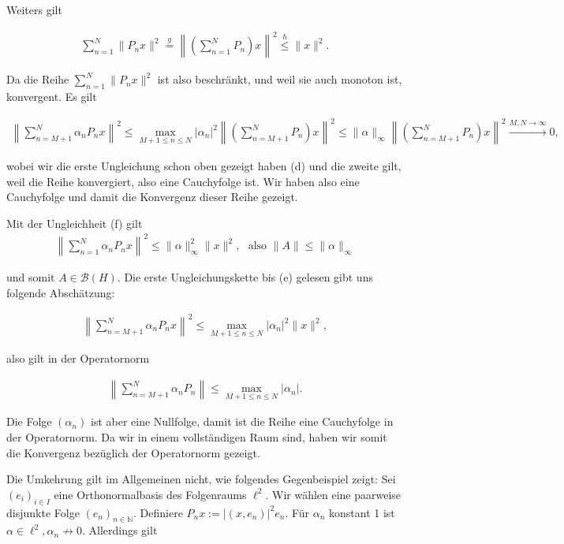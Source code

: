 \begin{solution}
  Weiters gilt

  \begin{align}
      \sum_{n = 1}^N \| P_n x \|^2 \stackrel{g}{=}
       \left\| \left(\sum_{n = 1}^N P_n\right) x \right\|^2 \stackrel{h}{\leq} \|x\|^2.
  \end{align}

  Da die Reihe $\sum_{n = 1}^N \| P_n x \|^2$ ist also beschränkt, und weil sie auch monoton ist, konvergent. Es gilt

  \begin{align}
  \left\| \sum_{n = M+1}^N \alpha_n P_n x \right\|^2 \leq \max_{M+1 \leq n \leq N} |\alpha_n|^2 \left\| \left(\sum_{n = M+1}^N P_n\right) x \right\|^2
  \leq \|\alpha\|_{\infty} \left\| \left(\sum_{n = M+1}^N P_n\right) x \right\|^2 \stackrel{M, N \rightarrow \infty}{\longrightarrow} 0,
  \end{align}

  wobei wir die erste Ungleichung schon oben gezeigt haben (d) und die zweite gilt, weil die Reihe konvergiert, also eine Cauchyfolge ist. Wir haben also eine Cauchyfolge und damit die Konvergenz dieser Reihe gezeigt.

  Mit der Ungleichheit (f) gilt
  \begin{align}
      \left\| \sum_{n = 1}^N \alpha_n P_n x \right\|^2 \leq \| \alpha \|_{\infty}^2 \| x \|^2, \text{~~also~} \|A\| \leq \|\alpha\|_{\infty}
  \end{align}

  und somit $A \in \mathcal{B}(H).$ Die erste Ungleichungskette bis (e) gelesen gibt uns folgende Abschätzung:

  \begin{align}
  \left\| \sum_{n = M+1}^N \alpha_n P_n x \right\|^2 \leq \max_{M+1 \leq n \leq N} |\alpha_n|^2 \|x\|^2,
  \end{align}

  also gilt in der Operatornorm

  \begin{align}
  \left\| \sum_{n = M+1}^N \alpha_n P_n \right\| \leq \max_{M+1 \leq n \leq N} |\alpha_n|.
  \end{align}

  Die Folge $(\alpha_n)$ ist aber eine Nullfolge, damit ist die Reihe eine Cauchyfolge in der Operatornorm. Da wir in einem vollständigen Raum sind, haben wir somit die Konvergenz bezüglich der Operatornorm gezeigt.

  Die Umkehrung gilt im Allgemeinen nicht, wie folgendes Gegenbeispiel zeigt: Sei $(e_i)_{i \in I}$ eine Orthonormalbasis des Folgenraums $\ell^2.$ Wir wählen eine paarweise disjunkte Folge $(e_n)_{n \in \mathbb{N}}.$ Definiere $P_nx := |(x, e_n)|^2 e_n.$ Für $\alpha_n$ konstant 1 ist $\alpha \in \ell^2, \alpha_n \not \rightarrow 0$. Allerdings gilt


\end{solution}
